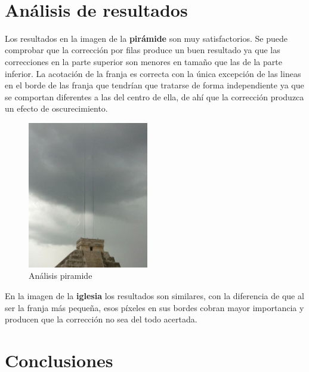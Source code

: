 \documentclass[11pt]{article}
\begin{document}
    \begin{center}
    \end{center}
    { \hspace*{\fill} \\}
    
    \hypertarget{anuxe1lisis-de-resultados}{%
\section{Análisis de resultados}\label{anuxe1lisis-de-resultados}}

Los resultados en la imagen de la \textbf{pirámide} son muy
satisfactorios. Se puede comprobar que la corrección por filas produce
un buen resultado ya que las correcciones en la parte superior son
menores en tamaño que las de la parte inferior. La acotación de la
franja es correcta con la única excepción de las lineas en el borde de
las franja que tendrían que tratarse de forma independiente ya que se
comportan diferentes a las del centro de ella, de ahí que la corrección
produzca un efecto de oscurecimiento.

\begin{figure}
\centering
\includegraphics{imagenes/analisis_piramide1.png}
\caption{Análisis piramide}
\end{figure}

En la imagen de la \textbf{iglesia} los resultados son similares, con la
diferencia de que al ser la franja más pequeña, esos píxeles en sus
bordes cobran mayor importancia y producen que la corrección no sea del
todo acertada.

\hypertarget{conclusiones}{%
\section{Conclusiones}\label{conclusiones}}
\end{document}
